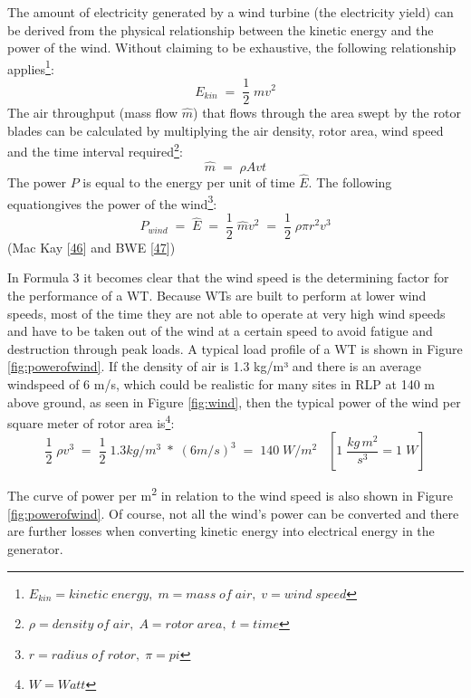 \documentclass[a4paper,11pt]{article}
\begin{document}
The amount of electricity generated by a wind turbine (the electricity yield) can be derived from the physical relationship between the kinetic energy and the power of the wind. Without claiming to be exhaustive, the following relationship applies\footnote{\(E_{kin}= kinetic\; energy,\; m=mass\; of\; air,\; v= wind\;speed\)}:
\begin{equation}
E_{kin}\; =\; \frac{1}{2}\;mv^2
\end{equation}
The air throughput (mass flow \(\hat{m}\)) that flows through the area swept by the rotor blades can be calculated by multiplying the air density, rotor area, wind speed and the time interval required\footnote{\(\rho= density\; of\; air,\; A= rotor\; area,\; t=time\)}:
\begin{equation}
\hat{m}\;=\;\rho A vt
\end{equation}
The power \(P\) is equal to the energy per unit of time \(\hat{E}\). The following equationgives the power of the wind\footnote{\(r= radius\; of\; rotor, \; \pi=pi\)}:
\begin{equation}
P_{wind}\;=\;\hat{E}\;=\;\frac{1}{2}\;\hat{m}v^2\;=\;\frac{1}{2}\; \rho \pi r^2 v^3
\end{equation}
(Mac Kay {[}\protect\hyperlink{ref-DavidJCMacKay.2009}{46}{]} and BWE {[}\protect\hyperlink{ref-BWE.2021}{47}{]})

In Formula 3 it becomes clear that the wind speed is the determining factor for the performance of a WT. Because WTs are built to perform at lower wind speeds, most of the time they are not able to operate at very high wind speeds and have to be taken out of the wind at a certain speed to avoid fatigue and destruction through peak loads. A typical load profile of a WT is shown in Figure \ref{fig:powerofwind}. If the density of air is 1.3 kg/m³ and there is an average windspeed of 6 m/s, which could be realistic for many sites in RLP at 140 m above ground, as seen in Figure \ref{fig:wind}, then the typical power of the wind per square meter of rotor area is\footnote{\(W= Watt\)}:
\begin{equation}
\frac{1}{2}\; \rho v^3\;=\;\frac{1}{2}\;1.3 kg/m^3\; *\; (6 m/s)^3\;=\;140\; W/m^2\;\;\; [1\; \frac{kg\, m^2}{s^3} = 1\; W]
\end{equation}
\newpage

The curve of power per m\textsuperscript{2} in relation to the wind speed is also shown in Figure \ref{fig:powerofwind}. Of course, not all the wind's power can be converted and there are further losses when converting kinetic energy into electrical energy in the generator.
\end{document}

